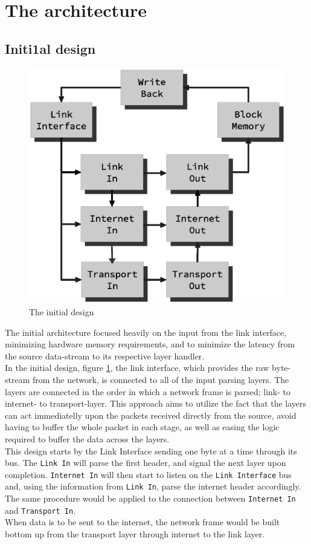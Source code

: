 \section{The architecture}
\subsection{Initi1al design}

\begin{figure}
    \includegraphics[scale=0.45]{design/design_0.eps}
    \caption{The initial design}
    \label{fig:initial_design}
\end{figure}

The initial architecture focused heavily on the input from the link interface, 
minimizing hardware memory requirements, and to minimize the latency from the 
source data-stream to its respective layer handler.\\
In the initial design, figure \ref{fig:initial_design}, the link interface, which
provides the raw byte-stream from the network, is connected to all of the input
parsing layers. The layers are connected in the order in which a network frame 
is parsed; link- to internet- to transport-layer. This approach aims to utilize
the fact that the layers can act immediatelly upon the packets received directly
from the source, avoid having to buffer the whole packet in each stage, as well 
as easing the logic required to buffer the data across the layers.\\
This design starts by the Link Interface sending one byte at a time through its bus. 
The \texttt{Link In} will parse the first header, and signal the next layer upon completion.
\texttt{Internet In} will then start to listen on the \texttt{Link Interface} bus
and, using the information from \texttt{Link In}, parse the internet header 
accordingly. The same procedure would be applied to the connection between 
\texttt{Internet In} and \texttt{Transport In}.\\
When data is to be sent to the internet, the network frame would be built bottom
up from the transport layer through internet to the link layer.

